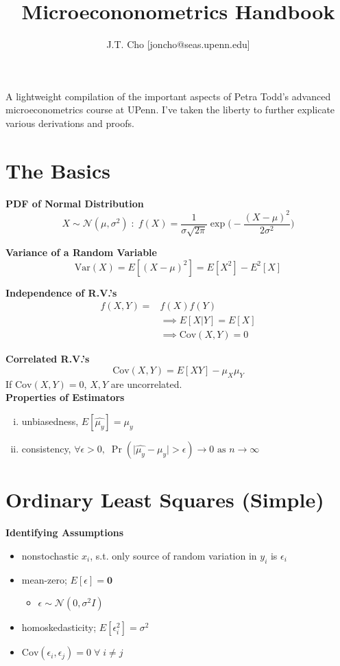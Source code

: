 \documentclass[16pt]{article}
\begin{document}
\title{Microecononometrics Handbook}
\author{J.T. Cho [joncho@seas.upenn.edu]}
\date{}

\maketitle

\begin{center}
A lightweight compilation of the important aspects of Petra Todd's advanced microeconometrics course at UPenn. I've taken the liberty to further explicate various derivations and proofs.
\end{center}

\section*{The Basics}

\textbf{PDF of Normal Distribution}
$$X \sim \mathcal{N}(\mu, \sigma^2)\;:\; f(X) = \frac{1}{\sigma \sqrt{2\pi}} \exp\bigg(-\frac{(X - \mu)^2}{2\sigma^2}\bigg)$$

\textbf{Variance of a Random Variable}
$$\text{Var}(X) = E[(X - \mu)^2] = E[X^2] - E^2[X]$$

\textbf{Independence of R.V.'s}
\begin{align*}
f(X, Y) =& f(X)f(Y) \\&\implies E[X|Y] = E[X]\\&\implies \text{Cov}(X,Y) = 0
\end{align*}

\textbf{Correlated R.V.'s}
$$\text{Cov}(X,Y) = E[XY] - \mu_X \mu_Y$$
If $\text{Cov}(X,Y) = 0$, $X, Y$ are uncorrelated.\\

\textbf{Properties of Estimators}
\begin{enumerate}[(i)]
  \item unbiasedness, $E[\hat{\mu_y}] = \mu_y$
  \item consistency, $\forall \epsilon > 0,\; \Pr(\mid \hat{\mu_y} - \mu_y \mid > \epsilon) \rightarrow 0 \text{ as } n\rightarrow\infty$
\end{enumerate}

\section*{Ordinary Least Squares (Simple)}

\textbf{Identifying Assumptions}

\begin{itemize}
\item nonstochastic $x_i$, s.t. only source of random variation in $y_i$ is $\epsilon_i$
\item mean-zero; $E[\epsilon] = \mathbf{0}$
\begin{itemize}
  \item $\epsilon \sim \mathcal{N}(0, \sigma^2 I)$
\end{itemize}
\item homoskedasticity; $E[\epsilon_i^2] = \sigma^2$
\item $\text{Cov}(\epsilon_i, \epsilon_j) = 0\;\forall\;i \neq j$
\end{itemize}
\end{document}
